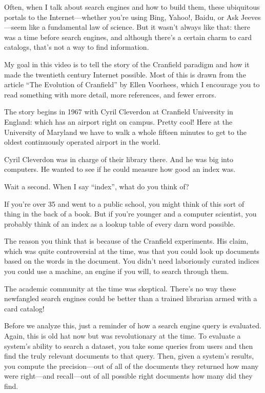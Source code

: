 
\label{chapter:cranfield}




Often, when I talk about search engines and how to build them, these ubiquitous portals to the Internet—whether you’re using Bing, Yahoo!, Baidu, or Ask Jeeves—seem like a fundamental law of science.  But it wasn’t always like that: there was a time before search engines, and although there’s a certain charm to card catalogs, that’s not a way to find information.

My goal in this video is to tell the story of the Cranfield paradigm and how it made the twentieth century Internet possible.  Most of this is drawn from the article “The Evolution of Cranfield” by Ellen Voorhees, which I encourage you to read something with more detail, more references, and fewer errors.

The story begins in 1967 with Cyril Cleverdon at Cranfield University in England: which has an airport right on campus.  Pretty cool!  Here at the University of Maryland we have to walk a whole fifteen minutes to get to the oldest continuously operated airport in the world.

Cyril Cleverdon was in charge of their library there.  And he was big into computers.  He wanted to see if he could measure how good an index was.  

Wait a second.  When I say “index”, what do you think of?

If you're over 35 and went to a public school, you might think of this sort of thing in the back of a book.  But if you’re younger and a computer scientist, you probably think of an index as a lookup table of every darn word possible.

The reason you think that is because of the Cranfield experiments.  His claim, which was quite controversial at the time, was that you could look up documents based on the words in the document.  You didn’t need laboriously curated indices you could use a machine, an engine if you will, to search through them.

The academic community at the time was skeptical.  There’s no way these newfangled search engines could be better than a trained librarian armed with a card catalog!

Before we analyze this, just a reminder of how a search engine query is evaluated.  Again, this is old hat now but was revolutionary at the time.  To evaluate a system’s ability to search a dataset, you take some queries from users and then find the truly relevant documents to that query.  Then, given a system’s results, you compute the precision—out of all of the documents they returned how many were right—and recall—out of all possible right documents how many did they find.

